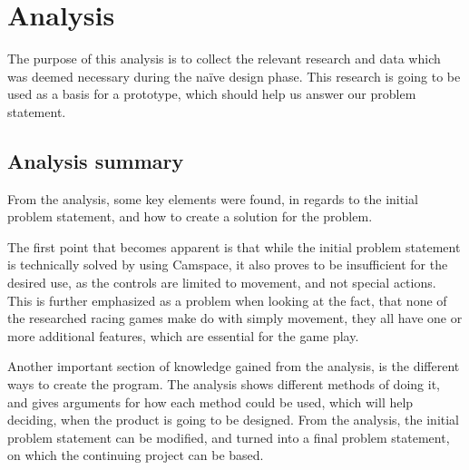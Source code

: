 \section{Analysis} \label{sec:analysis}
The purpose of this analysis is to collect the relevant research and data which was deemed necessary during the naïve design phase. This research is going to be used as a basis for a prototype, which should help us answer our problem statement. 










\subsection{Analysis summary}
From the analysis, some key elements were found, in regards to the initial problem statement, and how to create a solution for the problem.

The first point that becomes apparent is that while the initial problem statement is technically solved by using Camspace, it also proves to be insufficient for the desired use, as the controls are limited to movement, and not special actions. This is further emphasized as a problem when looking at the fact, that none of the researched racing games make do with simply movement, they all have one or more additional features, which are essential for the game play.

Another important section of knowledge gained from the analysis, is the different ways to create the program. The analysis shows different methods of doing it, and gives arguments for how each method could be used, which will help deciding, when the product is going to be designed.
From the analysis, the initial problem statement can be modified, and turned into a final problem statement, on which the continuing project can be based.

